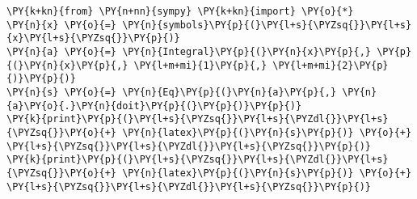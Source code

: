\begin{Verbatim}[commandchars=\\\{\}]
\PY{k+kn}{from} \PY{n+nn}{sympy} \PY{k+kn}{import} \PY{o}{*}
\PY{n}{x} \PY{o}{=} \PY{n}{symbols}\PY{p}{(}\PY{l+s}{\PYZsq{}}\PY{l+s}{x}\PY{l+s}{\PYZsq{}}\PY{p}{)}
\PY{n}{a} \PY{o}{=} \PY{n}{Integral}\PY{p}{(}\PY{n}{x}\PY{p}{,} \PY{p}{(}\PY{n}{x}\PY{p}{,} \PY{l+m+mi}{1}\PY{p}{,} \PY{l+m+mi}{2}\PY{p}{)}\PY{p}{)}
\PY{n}{s} \PY{o}{=} \PY{n}{Eq}\PY{p}{(}\PY{n}{a}\PY{p}{,} \PY{n}{a}\PY{o}{.}\PY{n}{doit}\PY{p}{(}\PY{p}{)}\PY{p}{)}
\PY{k}{print}\PY{p}{(}\PY{l+s}{\PYZsq{}}\PY{l+s}{\PYZdl{}}\PY{l+s}{\PYZsq{}}\PY{o}{+} \PY{n}{latex}\PY{p}{(}\PY{n}{s}\PY{p}{)} \PY{o}{+} \PY{l+s}{\PYZsq{}}\PY{l+s}{\PYZdl{}}\PY{l+s}{\PYZsq{}}\PY{p}{)}
\PY{k}{print}\PY{p}{(}\PY{l+s}{\PYZsq{}}\PY{l+s}{\PYZdl{}}\PY{l+s}{\PYZsq{}}\PY{o}{+} \PY{n}{latex}\PY{p}{(}\PY{n}{s}\PY{p}{)} \PY{o}{+} \PY{l+s}{\PYZsq{}}\PY{l+s}{\PYZdl{}}\PY{l+s}{\PYZsq{}}\PY{p}{)}
\end{Verbatim}
